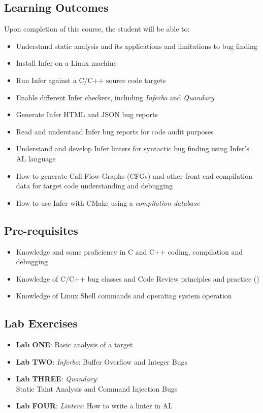 \subsection{Learning Outcomes}

Upon completion of this course, the student will be able to:
\begin{itemize}
	\itemsep0em
\item Understand static analysis and its applications and limitations to bug finding
\item Install Infer on a Linux machine
\item Run Infer against a C/C++ source code targets
\item Enable different Infer checkers, including \textit{Inferbo} and \textit{Quandary}
\item Generate Infer HTML and JSON bug reports
\item Read and understand Infer bug reports for code audit purposes
\item Understand and develop Infer linters for syntactic bug finding using Infer's AL language 
\item How to generate Call Flow Graphs (CFGs) and other front end compilation data for target code understanding and debugging
\item How to use Infer with CMake using a \textit{compilation database}
\end{itemize}

\subsection{Pre-requisites}
\begin{itemize}
\item Knowledge and some proficiency in C and C++ coding, compilation and debugging
\item Knowledge of C/C++ bug classes and Code Review principles and practice ()
\item Knowledge of Linux Shell commands and operating system operation
\end{itemize}

\subsection{Lab Exercises}

\begin{itemize}
\item \textbf{Lab ONE}: Basic analysis of a target
\item \textbf{Lab TWO}: \textit{Inferbo}: Buffer Overflow and Integer Bugs
\item \textbf{Lab THREE}: \textit{Quandary}: \\Static Taint Analysis and Command Injection Bugs
\item \textbf{Lab FOUR}: \textit{Linters}: How to write a linter in AL
\end{itemize}